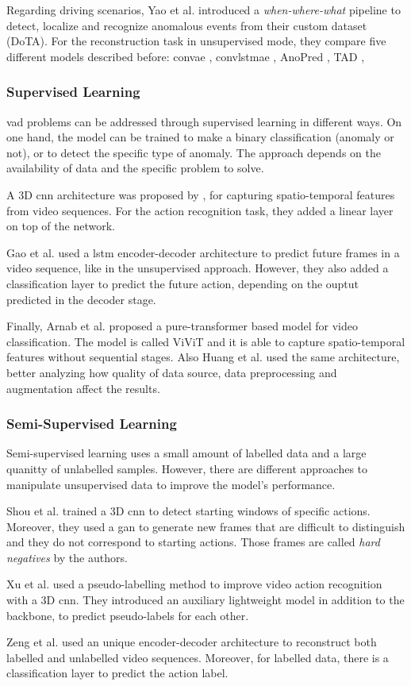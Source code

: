 Regarding driving scenarios, Yao et al. \cite{dota_dataset} introduced a 
\emph{when-where-what} pipeline to detect, localize and recognize anomalous 
events from their custom dataset (DoTA). For the reconstruction task in 
unsupervised mode, they compare five different models described before: 
\ac{convae} \cite{hasan_convae}, \ac{convlstmae} \cite{luo_lstmconvae}, 
AnoPred \cite{shanghaitech_dataset}, TAD \cite{a3d}, 

\subsubsection{Supervised Learning}
\ac{vad} problems can be addressed through supervised learning in different ways.
On one hand, the model can be trained to make a binary classification (anomaly 
or not), or to detect the specific type of anomaly. The approach depends on the 
availability of data and the specific problem to solve.

A 3D \ac{cnn} architecture was proposed by 
\cites{tran_3dconvnet}{carreira_3dconvnet}{diba_3dconvnet},
for capturing spatio-temporal
features from video sequences. For the action recognition task, they added a 
linear layer on top of the network.

Gao et al. \cite{gao_lstm_encoder} used a \ac{lstm} encoder-decoder architecture 
to predict future frames in a video sequence, like in the unsupervised 
approach. However, they also added a classification layer to predict the 
future action, depending on the ouptut predicted in the decoder stage.

Finally, Arnab et al. \cite{vivit} proposed a pure-transformer based model for 
video classification. The model is called ViViT and it is able to capture 
spatio-temporal features without sequential stages.
Also Huang et al. \cite{vivit} used the same architecture, better analyzing how 
quality of data source, data preprocessing and augmentation affect the results.

\subsubsection{Semi-Supervised Learning}
Semi-supervised learning uses a small amount of labelled data and a large 
quanitty of unlabelled samples. However, there are different approaches to 
manipulate unsupervised data to improve the model's performance.

Shou et al. \cite{shou_gan} trained a 3D \ac{cnn} to detect starting windows 
of specific actions. Moreover, they used a \ac{gan} to generate new frames 
that are difficult to distinguish and they do not correspond to starting actions.
Those frames are called \emph{hard negatives} by the authors.

Xu et al. \cite{xu_pl_var} used a pseudo-labelling method to improve video 
action recognition with a 3D \ac{cnn}. They introduced an auxiliary lightweight 
model in addition to the backbone, to predict pseudo-labels for each other.

Zeng et al. \cite{zenc_enc_dec_ssl} used an unique encoder-decoder architecture 
to reconstruct both labelled and unlabelled video sequences.
Moreover, for labelled data, there is a classification layer to predict the 
action label.
